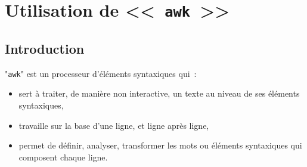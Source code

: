%
%

\setcounter{remarque-cnt}{1}
\setcounter{example-cnt}{1}
\chapter{\label{adv-fltrs-awk}Utilisation de <<~{\tt awk}~>>}
\thispagestyle{fancy}

\section{Introduction}

"\texttt{awk}" est un processeur d'{\'e}l{\'e}ments syntaxiques qui~:
\begin{itemize}
	\item	sert {\`a} traiter, de mani{\`e}re non interactive, un texte au
			niveau de ses {\'e}l{\'e}ments syntaxiques,
	\item	travaille sur la base d'une ligne, et ligne apr{\`e}s ligne,
	\item	permet de d{\'e}finir, analyser, transformer les mots ou {\'e}l{\'e}ments
			syntaxiques qui composent chaque ligne.
\end{itemize}

